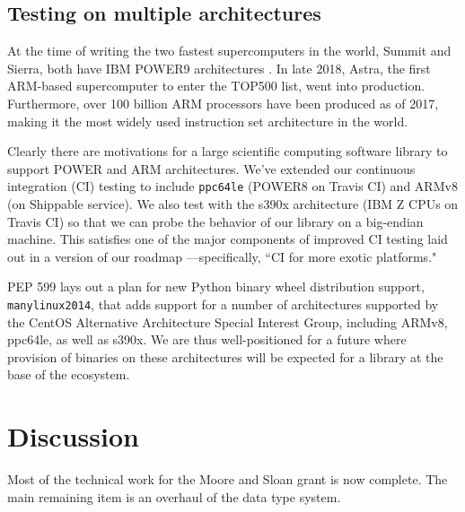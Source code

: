 \subsection*{Testing on multiple architectures}

At the time of writing the two fastest supercomputers in the
world, Summit and Sierra, both have IBM POWER9 architectures
\cite{top500nov2019}. In late 2018, Astra, the first ARM-based
supercomputer to enter the TOP500 list, went into production\cite{
astra-wiki}. Furthermore, over 100 billion ARM processors have been
produced as of 2017\cite{arm-architecture}, making it the most 
widely used instruction set architecture in the world.

Clearly there are motivations for a large scientific computing
software library to support POWER and ARM architectures. We've extended
our continuous integration (CI) testing to include \texttt{ppc64le}
(POWER8 on Travis CI) and ARMv8 (on Shippable service). We also test
with the s390x architecture (IBM Z CPUs on Travis CI) so that we
can probe the behavior of our library on a big-endian machine.
This satisfies one of the major components of
improved CI testing laid out in a version of our roadmap
\cite{numpy-roadmap}---specifically, ``CI for more exotic
platforms."

PEP 599\cite{PEP599} lays out a plan for new Python binary wheel
distribution support, \texttt{manylinux2014}, that adds
support for a number of architectures supported by the CentOS
Alternative Architecture Special Interest Group, including
ARMv8, ppc64le, as well as s390x. We are thus well-positioned
for a future where provision of binaries on these architectures
will be expected for a library at the base of the ecosystem.


\section*{Discussion}


Most of the technical work for the Moore and Sloan grant is now complete.
The main remaining item is an overhaul of the data type system.


